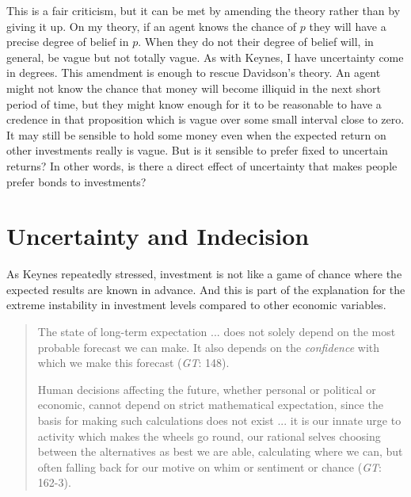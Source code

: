 This is a fair criticism, but it can be met by amending the theory rather than by giving it up. On my theory, if an agent knows the chance of \(p\) they will have a precise degree of belief in \(p\). When they do not their degree of belief will, in general, be vague but not totally vague. As with Keynes, I have uncertainty come in degrees. This amendment is enough to rescue Davidson's theory. An agent might not know the chance that money will become illiquid in the next short period of time, but they might know enough for it to be reasonable to have a credence in that proposition which is vague over some small interval close to zero. It may still be sensible to hold some money even when the expected return on other investments really is vague. But is it sensible to prefer fixed to uncertain returns? In other words, is there a direct effect of uncertainty that makes people prefer bonds to investments? 

\section{Uncertainty and Indecision}
As Keynes repeatedly stressed, investment is not like a game of chance where the expected results are known in advance. And this is part of the explanation for the extreme instability in investment levels compared to other economic variables.

\begin{quote}
The state of long-term expectation ... does not solely depend on the most probable forecast we can make. It also depends on the \textit{confidence} with which we make this forecast (\textit{GT}: 148).

Human decisions affecting the future, whether personal or political or economic, cannot depend on strict mathematical expectation, since the basis for making such calculations does not exist ... it is our innate urge to activity which makes the wheels go round, our rational selves choosing between the alternatives as best we are able, calculating where we can, but often falling back for our motive on whim or sentiment or chance (\textit{GT}: 162-3).
\end{quote}


